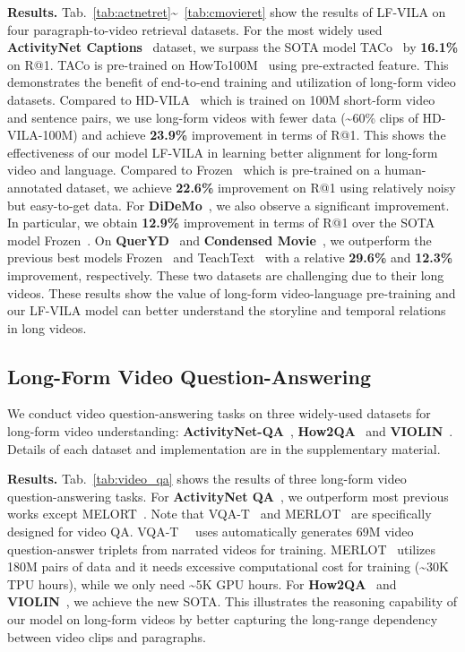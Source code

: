 \documentclass{article}
\begin{document}
\textbf{Results.}
Tab.~\ref{tab:actnetret}\textasciitilde \ \ref{tab:cmovieret} show the results of LF-VILA on four paragraph-to-video retrieval datasets.
For the most widely used \textbf{ActivityNet Captions}~\cite{krishna2017actnetcaption} dataset, we surpass the SOTA model TACo~\cite{yang2021taco} by \textbf{16.1\%} on R@1. TACo is pre-trained on HowTo100M~\cite{miech2019howto100m} using pre-extracted feature. This demonstrates the benefit of end-to-end training and utilization of long-form video datasets. 
Compared to HD-VILA~\cite{xue2021hdvila} which is trained on 100M short-form video and sentence pairs, we use long-form videos with fewer data (\textasciitilde 60\% clips of HD-VILA-100M) and achieve \textbf{23.9\%} improvement in terms of R@1. This shows the effectiveness of our model LF-VILA in learning better alignment for long-form video and language. Compared to Frozen~\cite{bain2021frozen} which is pre-trained on a human-annotated dataset, we achieve \textbf{22.6\%} improvement on R@1 using relatively noisy but easy-to-get data.
For \textbf{DiDeMo}~\cite{anne2017didemo}, we also observe a significant improvement. In particular, we obtain \textbf{12.9\%} improvement in terms of R@1 over the SOTA model Frozen~\cite{bain2021frozen}.
On \textbf{QuerYD}~\cite{oncescu2021queryd} and \textbf{Condensed Movie}~\cite{bain2020cmovie}, we outperform the previous best models Frozen~\cite{bain2021frozen} and TeachText~\cite{croitoru2021teachtext} with a relative \textbf{29.6\%} and \textbf{12.3\%} improvement, respectively. These two datasets are challenging due to their long videos. These results show the value of long-form video-language pre-training and our LF-VILA model can better understand the storyline and temporal relations in long videos.


\subsection{Long-Form Video Question-Answering}
We conduct video question-answering tasks on three widely-used datasets for long-form video understanding: \textbf{ActivityNet-QA}~\cite{yu2019activitynetqa}, \textbf{How2QA}~\cite{li2020hero} and \textbf{VIOLIN}~\cite{liu2020violin}. Details of each dataset and implementation are in the supplementary material.


\textbf{Results.}
Tab.~\ref{tab:video_qa} shows the results of three long-form video question-answering tasks.
For \textbf{ActivityNet QA}~\cite{yu2019activitynetqa}, we outperform most previous works except MELORT~\cite{zellers2021merlot}. Note that VQA-T~\cite{yang2021justask} and MERLOT~\cite{zellers2021merlot} are specifically designed for video QA. VQA-T~~\cite{yang2021justask} uses automatically generates 69M video question-answer triplets from narrated videos for training. MERLOT~\cite{zellers2021merlot} utilizes 180M pairs of data and it needs excessive computational cost for training (\textasciitilde 30K TPU hours), while we only need \textasciitilde 5K GPU hours.
For \textbf{How2QA}~\cite{li2020hero} and \textbf{VIOLIN}~\cite{liu2020violin}, we achieve the new SOTA. This illustrates the reasoning capability of our model on long-form videos by better capturing the long-range dependency between video clips and paragraphs.
\end{document}

